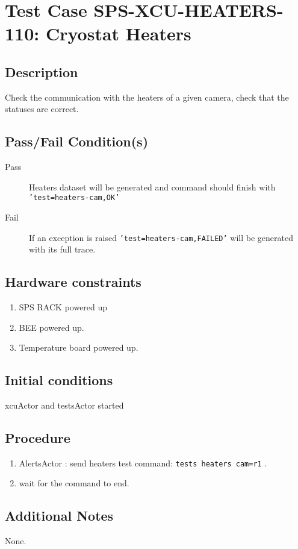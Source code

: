 \section{Test Case SPS-XCU-HEATERS-110: Cryostat Heaters}

\subsection{Description}

Check the communication with the heaters of a given camera, check that the statuses are correct.

\subsection{Pass/Fail Condition(s)}

\begin{description}
\item [Pass] Heaters dataset will be generated and command should finish with \texttt{'test=heaters-cam,OK'}
\item [Fail] If an exception is raised \texttt{'test=heaters-cam,FAILED'} will be generated with its full trace.

\end{description}

\subsection{Hardware constraints}

\begin{enumerate}
    \item SPS RACK powered up
    \item BEE powered up.
    \item Temperature board powered up.
\end{enumerate}

\subsection{Initial conditions}

xcuActor and testsActor started

\subsection{Procedure}

\begin{enumerate}
    \item AlertsActor : send heaters test command: \texttt{tests heaters cam=r1} .
    \item wait for the command to end.
\end{enumerate}

\subsection{Additional Notes}
None.
